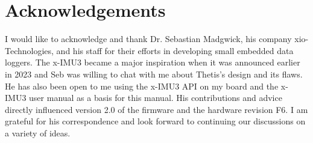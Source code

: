 \section*{Acknowledgements}

I would like to acknowledge and thank Dr. Sebastian Madgwick, his company xio-Technologies, and his staff for their efforts in developing small embedded data loggers.
The x-IMU3 became a major inspiration when it was announced earlier in 2023 and Seb was willing to chat with me about Thetis's design and its flaws.
He has also been open to me using the x-IMU3 API on my board and the x-IMU3 user manual as a basis for this manual.
His contributions and advice directly influenced version 2.0 of the firmware and the hardware revision F6.
I am grateful for his correspondence and look forward to continuing our discussions on a variety of ideas.